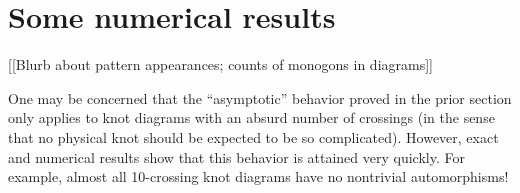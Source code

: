 \documentclass[amsmath,longbibliography,secnumarabic,floatfix,amssymb,nofootinbib,nobibnotes,letterpaper,11pt,tightenlines,notitlepage,showkeys,showlabels]{amsart}%
\theoremstyle{definition}
\begin{document}
\section{Some numerical results}
\label{sec:randres}

[[Blurb about pattern appearances; counts of monogons in diagrams]]

One may be concerned that the ``asymptotic'' behavior proved in the prior section only applies to
knot diagrams with an absurd number of crossings (in the sense that no physical knot should be
expected to be so complicated). However, exact and numerical results show that this behavior is
attained very quickly. For example, almost all 10-crossing knot diagrams have no nontrivial
automorphisms!

\printbibliography
\end{document}
